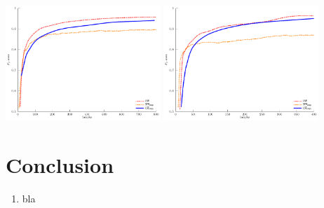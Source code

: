 \documentclass[10pt,mathserif,serif]{beamer}
\begin{document}
\begin{frame}
\begin{center}
\includegraphics[width=2.3in]{figures/ev_chl_imp}
\includegraphics[width=2.3in]{figures/ev_bgape_imp}
\end{center}
\end{frame}

\section*{Conclusion}

\begin{frame}
\begin{enumerate}
\item bla
\end{enumerate}
\end{frame}
\end{document}
